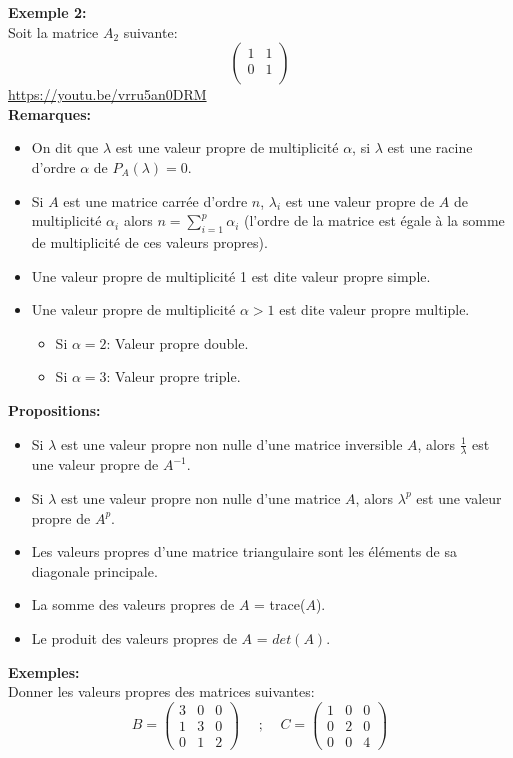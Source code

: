 \documentclass[a4paper,12pt,french]{article}
\begin{document}
\textbf{Exemple 2:}\\
Soit la matrice $A_{2}$ suivante:
\[\begin{pmatrix}
1 & 1  \\
0 & 1 \\

\end{pmatrix}\] 
\url{https://youtu.be/vrru5an0DRM}\\
 \textbf{Remarques:}
 \begin{itemize}
 	\item On dit que $\lambda$ est une valeur propre de multiplicité $\alpha$, si $\lambda$ est une racine d'ordre $\alpha$ de $P_{A}(\lambda)=0$.
 	\item Si $A$ est une matrice carrée d'ordre $n$, $\lambda_{i}$ est une valeur propre de $A$ de multiplicité $\alpha_{i}$ alors $n=\sum_{i=1}^{p}\alpha_{i}$ (l'ordre de la matrice est égale à la somme de multiplicité de ces valeurs propres).
 	\item Une valeur propre de multiplicité 1 est dite valeur propre simple.
 	\item Une valeur propre de multiplicité $\alpha >1$ est dite valeur propre multiple.
 	\begin{itemize}
 		\item Si $\alpha=2$: Valeur propre double.
 		\item Si $\alpha=3$: Valeur propre triple.
 	\end{itemize}
 \end{itemize}

\textbf{Propositions:}
\begin{itemize}
	\item Si $\lambda$ est une valeur propre non nulle d'une matrice inversible $A$, alors $\frac{1}{\lambda}$ est une valeur propre de $A^{-1}$.
	\item Si $\lambda$ est une valeur propre non nulle d'une matrice $A$, alors  $\lambda ^{p}$ est une valeur propre de $A^p$.
	\item Les valeurs propres d'une matrice triangulaire sont les éléments de sa diagonale principale.
	\item La somme des valeurs propres de $A$ = trace($A$).
	\item Le produit des valeurs propres de $A$ = $det(A)$.
\end{itemize}
\textbf{Exemples:}\\
Donner les valeurs propres des matrices suivantes:
\[B=\begin{pmatrix}
	3 & 0 & 0  \\
	1 & 3 & 0 \\
	0 & 1 & 2
	
\end{pmatrix}	~~~~~~;~~~~~ C=\begin{pmatrix}
1 & 0 & 0  \\
0 & 2 & 0 \\
0 & 0 & 4

\end{pmatrix}\] 
\end{document}
